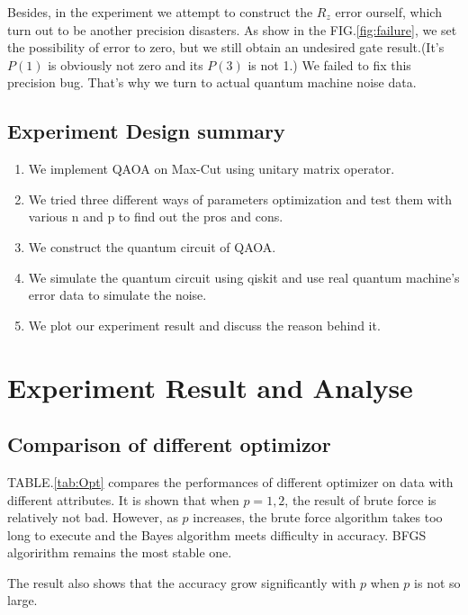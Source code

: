 Besides, in the experiment we attempt to construct the $R_z$ error ourself, which turn out to be another precision disasters. As show in the FIG.\ref{fig:failure}, we set the possibility of error to zero, but we still obtain an undesired gate result.(It's $P(1)$ is obviously not zero and its $P(3)$ is not 1.) We failed to fix this precision bug. That's why we turn to actual quantum machine noise data.




\subsection{Experiment Design summary}
\begin{enumerate}
    \item We implement QAOA on Max-Cut using  unitary matrix operator.
    \item We tried three different ways of parameters optimization and test them with various n and p to find out the pros and cons.
    \item We construct the quantum circuit of QAOA.
    \item We simulate the quantum circuit using qiskit and use real quantum machine's error data to simulate the noise.
    \item We plot our experiment result and discuss the reason behind it.
\end{enumerate}
\clearpage
\section{Experiment Result and Analyse}

\subsection{Comparison of different optimizor}

TABLE.\ref{tab:Opt} compares the performances of different optimizer on data with different attributes. It is shown that when $p=1, 2$, the result of brute force is relatively not bad. However, as $p$ increases, the brute force algorithm takes too long to execute and the Bayes algorithm meets difficulty in accuracy. BFGS algoririthm remains the most stable one.

The result also shows that the accuracy grow significantly with $p$ when $p$ is not so large.

